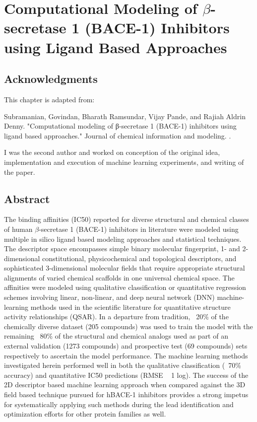 \section{Computational Modeling of $\beta$-secretase 1 (BACE-1) Inhibitors using Ligand Based Approaches}

\subsection{Acknowledgments}

This chapter is adapted from: 

Subramanian, Govindan, Bharath Ramsundar, Vijay Pande, and Rajiah Aldrin Denny. "Computational modeling of β-secretase 1 (BACE-1) inhibitors using ligand based approaches." Journal of chemical information and modeling. \cite{subramanian2016computational}.

I was the second author and worked on conception of the original idea, implementation and execution of machine learning experiments, and writing of the paper.

\subsection{Abstract}
The binding affinities (IC50) reported for diverse structural and chemical classes of human $\beta$-secretase 1 (BACE-1) inhibitors in literature were modeled using multiple in silico ligand based modeling approaches and statistical techniques.  The descriptor space encompasses simple binary molecular fingerprint, 1- and 2-dimensional constitutional, physicochemical and topological descriptors, and sophisticated 3-dimensional molecular fields that require appropriate structural alignments of varied chemical scaffolds in one universal chemical space.  The affinities were modeled using qualitative classification or quantitative regression schemes involving linear, non-linear, and deep neural network (DNN) machine-learning methods used in the scientific literature for quantitative structure activity relationships (QSAR).  In a departure from tradition, ~20\% of the chemically diverse dataset (205 compounds) was used to train the model with the remaining ~80\% of the structural and chemical analogs used as part of an external validation (1273 compounds) and prospective test (69 compounds) sets respectively to ascertain the model performance.  The machine learning methods investigated herein performed well in both the qualitative classification (~70\% accuracy) and quantitative IC50 predictions (RMSE ~ 1 log).  The success of the 2D descriptor based machine learning approach when compared against the 3D field based technique pursued for hBACE-1 inhibitors provides a strong impetus for systematically applying such methods during the lead identification and optimization efforts for other protein families as well.


